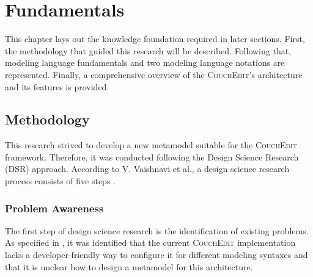\chapter{Fundamentals}
\label{ch:fundamentals}

This chapter lays out the knowledge foundation required in later sections. First, the methodology that guided this research will be described. Following that, modeling language fundamentals and two modeling language notations are represented. Finally, a comprehensive overview of the \textsc{CouchEdit}'s architecture and its features is provided. 




\section{Methodology}
This research strived to develop a new metamodel suitable for the \textsc{CouchEdit} framework. Therefore, it was conducted following the Design Science Research (DSR) approach. According to V. Vaishnavi et al., a design science research process consists of five steps \cite{vaishnavi_design_2004}.

\subsection{Problem Awareness}
The first step of design science research is the identification of existing problems. As specified in , it was identified that the current \textsc{CouchEdit} implementation lacks a developer-friendly way to configure it for different modeling syntaxes and that it is unclear how to design a metamodel for this architecture.

